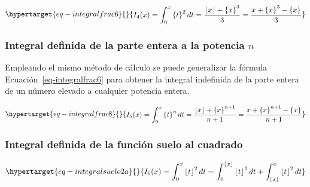 \documentclass[
  letterpaper,
  DIV=11,
  numbers=noendperiod]{scrreprt}
\begin{document}
\begin{equation}\protect\hypertarget{eq-integralfrac6}{}{
\begin{multline}
I_{4}(x) = \int_0^x \left\{{t}\right\}^2 dt =
\frac{ \left\lfloor x \right\rfloor + \left\{ x \right\}^3}{3} =
\frac{x + \left\{ x \right\}^{3}-\left\{ x \right\}}{3}
\end{multline}
}\label{eq-integralfrac6}\end{equation}

\hypertarget{integral-definida-de-la-parte-entera-a-la-potencia-n}{%
\subsubsection{\texorpdfstring{Integral definida de la parte entera a la
potencia
\(n\)}{Integral definida de la parte entera a la potencia n}}\label{integral-definida-de-la-parte-entera-a-la-potencia-n}}

Empleando el mismo método de cálculo se puede generalizar la fórmula
Ecuación~\ref{eq-integralfrac6} para obtener la integral indefinida de
la parte entera de un número elevado a cualquier potencia entera.

\begin{equation}\protect\hypertarget{eq-integralfrac8}{}{
\begin{multline}
I_{5}(x) = \int_0^x \left\{{t}\right\}^n dt =
\frac{\left\lfloor x \right\rfloor + \left\{ x \right\}^{n+1}}{n+1} =
\frac{x + \left\{ x \right\}^{n+1}-\left\{ x \right\}}{n+1}
\end{multline}
}\label{eq-integralfrac8}\end{equation}

\hypertarget{integral-definida-de-la-funciuxf3n-suelo-al-cuadrado}{%
\subsubsection{Integral definida de la función suelo al
cuadrado}\label{integral-definida-de-la-funciuxf3n-suelo-al-cuadrado}}

\begin{equation}\protect\hypertarget{eq-integralsuelo2a}{}{
\begin{multline}
I_{6}(x) = \int_{0}^{x}{\left\lfloor t \right\rfloor^2 dt} =
\int_{0}^{\left\lfloor x \right\rfloor}{\left\lfloor t \right\rfloor^2 dt} 
+ \int_{{\left\lfloor x \right\rfloor}}^{x}{\left\lfloor t \right\rfloor^2 dt}
\end{multline}
}\label{eq-integralsuelo2a}\end{equation}
\end{document}
